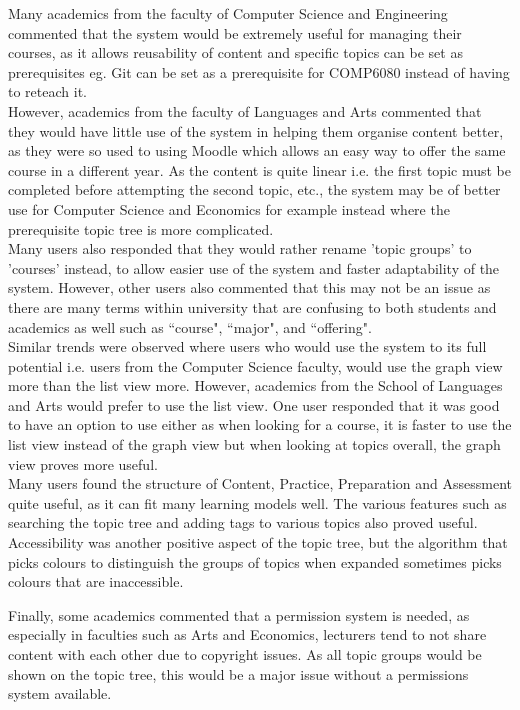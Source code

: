 Many academics from the faculty of Computer Science and Engineering commented that the system would be extremely useful for managing their courses, as it allows reusability of content and specific topics can be set as prerequisites eg. Git can be set as a prerequisite for COMP6080 instead of having to reteach it.\\

However, academics from the faculty of Languages and Arts commented that they would have little use of the system in helping them organise content better, as they were so used to using Moodle which allows an easy way to offer the same course in a different year. As the content is quite linear i.e. the first topic must be completed before attempting the second topic, etc., the system may be of better use for Computer Science and Economics for example instead where the prerequisite topic tree is more complicated.\\

Many users also responded that they would rather rename 'topic groups' to 'courses' instead, to allow easier use of the system and faster adaptability of the system. However, other users also commented that this may not be an issue as there are many terms within university that are confusing to both students and academics as well such as ``course", ``major", and ``offering".\\

Similar trends were observed where users who would use the system to its full potential i.e. users from the Computer Science faculty, would use the graph view more than the list view more. However, academics from the School of Languages and Arts would prefer to use the list view. One user responded that it was good to have an option to use either as when looking for a course, it is faster to use the list view instead of the graph view but when looking at topics overall, the graph view proves more useful.\\

Many users found the structure of Content, Practice, Preparation and Assessment quite useful, as it can fit many learning models well. The various features such as searching the topic tree and adding tags to various topics also proved useful. Accessibility was another positive aspect of the topic tree, but the algorithm that picks colours to distinguish the groups of topics when expanded sometimes picks colours that are inaccessible. 

Finally, some academics commented that a permission system is needed, as especially in faculties such as Arts and Economics, lecturers tend to not share content with each other due to copyright issues. As all topic groups would be shown on the topic tree, this would be a major issue without a permissions system available.\\

